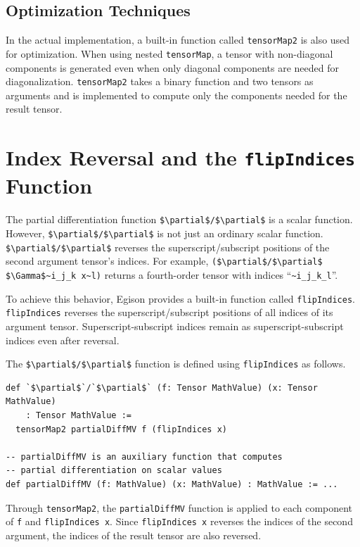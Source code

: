 \subsection{Optimization Techniques}

In the actual implementation, a built-in function called \lstinline{tensorMap2} is also used for optimization.
When using nested \lstinline{tensorMap}, a tensor with non-diagonal components is generated even when only diagonal components are needed for diagonalization.
\lstinline{tensorMap2} takes a binary function and two tensors as arguments and is implemented to compute only the components needed for the result tensor.

\section{Index Reversal and the \texttt{flipIndices} Function}

The partial differentiation function \lstinline[mathescape]!$\partial$/$\partial$! is a scalar function.
However, \lstinline[mathescape]!$\partial$/$\partial$! is not just an ordinary scalar function.
\lstinline[mathescape]!$\partial$/$\partial$! reverses the superscript/subscript positions of the second argument tensor's indices.
For example, \lstinline[mathescape]|($\partial$/$\partial$ $\Gamma$~i_j_k x~l)| returns a fourth-order tensor with indices ``\lstinline|~i_j_k_l|''.

To achieve this behavior, Egison provides a built-in function called \lstinline{flipIndices}.
\lstinline{flipIndices} reverses the superscript/subscript positions of all indices of its argument tensor.
Superscript-subscript indices remain as superscript-subscript indices even after reversal.

The \lstinline[mathescape]!$\partial$/$\partial$! function is defined using \lstinline{flipIndices} as follows.
\begin{lstlisting}[language=egison,numbers=none]
def `$\partial$`/`$\partial$` (f: Tensor MathValue) (x: Tensor MathValue)
    : Tensor MathValue :=
  tensorMap2 partialDiffMV f (flipIndices x)

-- partialDiffMV is an auxiliary function that computes
-- partial differentiation on scalar values
def partialDiffMV (f: MathValue) (x: MathValue) : MathValue := ...
\end{lstlisting}

Through \lstinline{tensorMap2}, the \lstinline{partialDiffMV} function is applied to each component of \lstinline{f} and \lstinline{flipIndices x}.
Since \lstinline{flipIndices x} reverses the indices of the second argument, the indices of the result tensor are also reversed.

